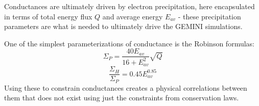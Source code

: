\documentclass[11pt,letterpaper]{article}
\begin{document}
Conductances are ultimately driven by electron precipitation, here encapsulated in terms of total energy flux $Q$ and average energy $E_{av}$ - these precipitation parameters are what is needed to ultimately drive the GEMINI simulations.  

One of the simplest parameterizations of conductance is the Robinson formulas:
\begin{equation}
\Sigma_P = \frac{40 E_{av}}{16+E_{av}^2} \sqrt{Q}
\end{equation}
\begin{equation}
\frac{\Sigma_H}{\Sigma_P} = 0.45 E_{av}^{0.85}
\end{equation}
Using these to constrain conductances creates a physical correlations between them that does not exist using just the constraints from conservation laws.  
\end{document}
